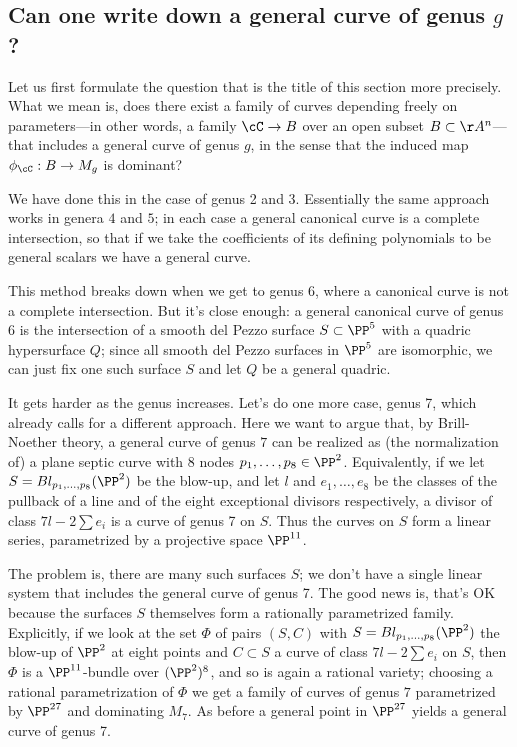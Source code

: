 \subsection{Can one write down a general curve of genus $g$?}\label{mgunirational}

Let us first formulate the question that is the title of this section more precisely. What we mean is, does there exist  a family of curves depending freely on parameters---in other words, a family $\cC \to B$ over an open subset $B \subset \AA^n$---that includes a general curve of genus $g$, in the sense that the induced map $\phi_\cC : B \to M_g$ is dominant? 	

We have done this in the case of genus 2 and 3. Essentially
the same approach works in genera $4$ and $5$; in each case a general canonical curve is a complete intersection, so that if we take the coefficients of its defining polynomials to be general scalars we have a general curve.

This method breaks down when we get to genus 6, where a canonical curve is not a complete intersection. But it's close enough: a general canonical curve of genus 6 is the intersection of a smooth del Pezzo surface $S \subset \PP^5$ with a quadric hypersurface $Q$; since all smooth del Pezzo surfaces in $\PP^5$ are isomorphic, we can just fix one such surface $S$ and let $Q$ be a general quadric.

It gets harder as the genus increases. Let's do one more case, genus 7, which already calls for a different approach. Here we want to argue that, by Brill-Noether theory, a general curve of genus $7$ can be realized as (the normalization of) a plane septic curve with 8 nodes $p_1,\dots,p_8 \in \PP^2$. Equivalently, if we let $S = Bl_{p_1,\dots,p_8}(\PP^2)$ be the blow-up, and let $l$ and $e_1,\dots,e_8$ be the classes of the pullback of a line and of the eight exceptional divisors respectively, a divisor of class $7l - 2 \sum e_i$ is a curve of genus 7 on $S$. Thus the curves on $S$ form a linear series, parametrized by a projective space $\PP^{11}$.

The problem is, there are many such surfaces $S$; we don't have a single linear system that includes the general curve of genus 7. The good news is, that's OK because the surfaces $S$ themselves form a rationally parametrized family. Explicitly, if we look at the set $\Phi$ of pairs $(S, C)$ with $S = Bl_{p_1,\dots,p_8}(\PP^2)$  the blow-up of $\PP^2$ at eight points and $C \subset S$ a curve of class $7l - 2 \sum e_i$ on $S$, then $\Phi$ is a $\PP^{11}$-bundle over $(\PP^2)^8$, and so is again a rational variety; choosing a rational parametrization of $\Phi$ we get a family of curves of genus $7$ parametrized by $\PP^{27}$ and dominating $M_7$. As before a general point in $\PP^{27}$ yields a general curve of genus 7.

